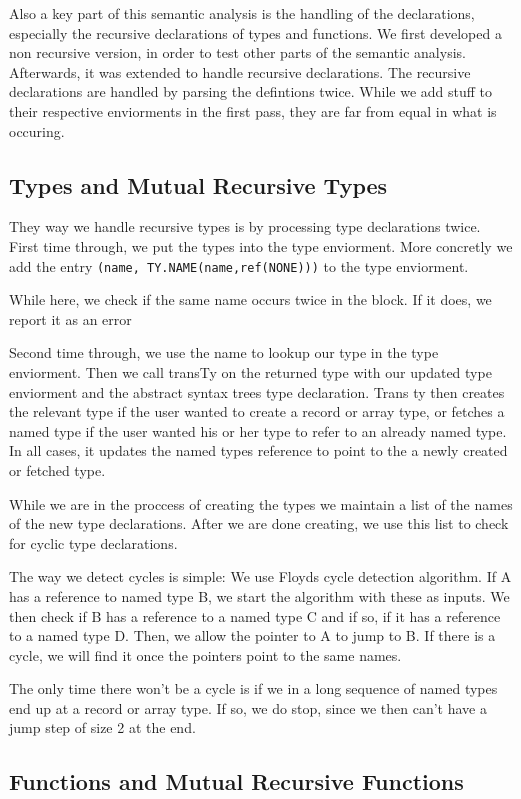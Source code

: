 \documentclass{article}
\begin{document}
Also a key part of this semantic analysis is the handling of the declarations, especially the recursive declarations of types and functions. We first developed a non recursive version, in order to test other parts of the semantic analysis. Afterwards, it was extended to handle recursive declarations. The recursive declarations are handled by parsing the defintions twice. While we add stuff to their respective enviorments in the first pass, they are far from equal in what is occuring. 

\subsection{Types and Mutual Recursive Types}
They way we handle recursive types is by processing type declarations twice. 
First time through, we put the types into the type enviorment. More concretly
we add the entry \texttt{(name, TY.NAME(name,ref(NONE)))} to the type enviorment.

While here, we check if the same name occurs twice in the block. If it does, we report it as an error

Second time through, we use the name to lookup our type in the type enviorment.
Then we call transTy on the returned type with our updated type enviorment and the abstract syntax trees type declaration.
Trans ty then creates the relevant type if the user wanted to create a record or array type, or fetches a named type if the user wanted his or her type
to refer to an already named type. In all cases, it updates the named types reference to point to the a newly created or fetched type.

While we are in the proccess of creating the types we maintain a list of the names of the new type declarations. After
we are done creating, we use this list to check for cyclic type declarations.

The way we detect cycles is simple: We use Floyds cycle detection algorithm. If A has a reference to named type B, we start the algorithm
with these as inputs. We then check if B has a reference to a named type C and if so, if it has a reference to a named type D. 
Then, we allow the pointer to A to jump to B. If there is a cycle, we will find it once the pointers point to the same names.


The only time there won't be a cycle is if we in a long sequence of named types end up at a record or array type. If so, we do stop, since we then can't have a jump
step of size 2 at the end.

\subsection{Functions and Mutual Recursive Functions}
\end{document}
